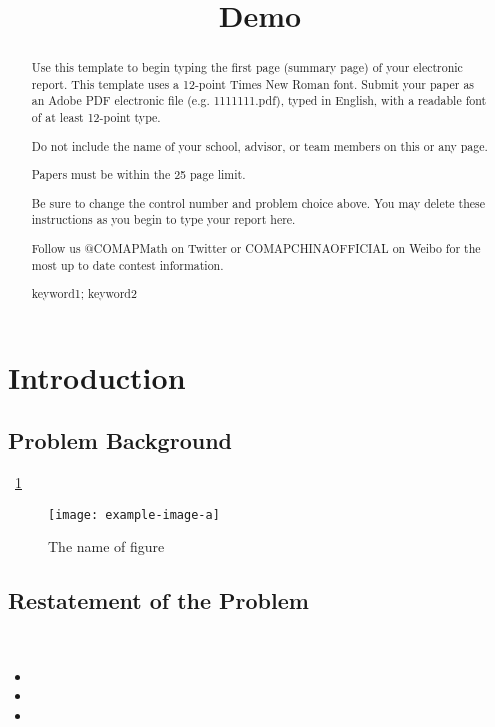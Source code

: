 \documentclass{mcmthesis}
\title{Demo}
\begin{document}
\begin{abstract}
Use this template to begin typing the first page (summary page) of your electronic report. This template uses a 12-point Times New Roman font. Submit your paper as an Adobe PDF electronic file (e.g. 1111111.pdf), typed in English, with a readable font of at least 12-point type.

Do not include the name of your school, advisor, or team members on this or any page.

Papers must be within the 25 page limit.

Be sure to change the control number and problem choice above.
You may delete these instructions as you begin to type your report here.

Follow us @COMAPMath on Twitter or COMAPCHINAOFFICIAL on Weibo for the most up to date contest information.

\begin{keywords}
keyword1; keyword2
\end{keywords}
\end{abstract}
\maketitle
\tableofcontents
\newpage
\section{Introduction}
\subsection{Problem Background}
\ 
\indent \lipsum[1] \ref{fig:aa}
\begin{figure}[htbp]
	\small
	\centering
	\texttt{[image: example-image-a]}
	\caption{The name of figure} \label{fig:aa}
\end{figure}

\lipsum[2]

\subsection{Restatement of the Problem}
\ 
\begin{itemize}
	\item
	\item
	\item
\end{itemize}
\end{document}
